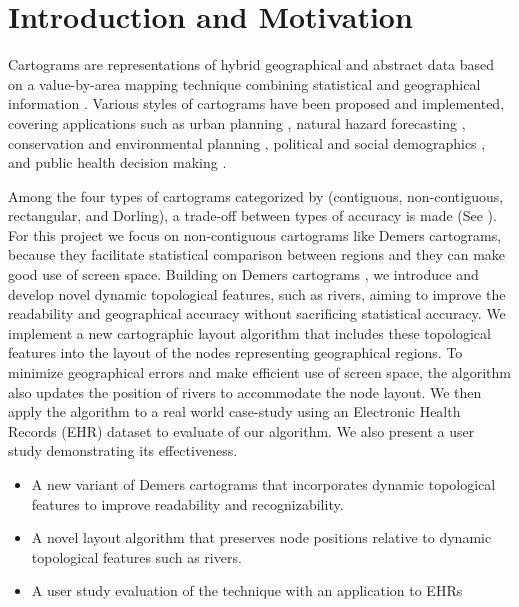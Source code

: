 \section{Introduction and Motivation}

Cartograms are representations of hybrid geographical and abstract data based on a value-by-area mapping technique combining statistical and geographical information \cite{dent2009Cartography}. Various styles of cartograms have been proposed and implemented, covering applications such as urban planning \cite{harris2018Mapping, arranz-lopez2021Enduser}, natural hazard forecasting \cite{pappenberger2019Cartograms, park2020Flood}, conservation and environmental planning \cite{galluzzi2018Mapping, rocchini2019Cartogramming}, political and social demographics \cite{breitzman2018Using, alieva2021How}, and public health decision making \cite{gao2020Visualising, sack2021Visualizing}.

Among the four types of cartograms categorized by  (contiguous, non-contiguous, rectangular, and Dorling), a trade-off between types of accuracy is made (See ). For this project we focus on non-contiguous cartograms like Demers cartograms, because they facilitate statistical comparison between regions and they can make good use of screen space. Building on Demers cartograms \cite{ian2002Cartogram}, we introduce and develop novel dynamic topological features, such as rivers, aiming to improve the readability and geographical accuracy without sacrificing statistical accuracy. We implement a new cartographic layout algorithm that includes these topological features into the layout of the nodes representing geographical regions. To minimize geographical errors and make efficient use of screen space, the algorithm also updates the position of rivers to accommodate the node layout. We then apply the algorithm to a real world case-study using an Electronic Health Records (EHR) dataset to evaluate of our algorithm. We also present a user study demonstrating its effectiveness.


\begin{itemize}
    \item A new variant of Demers cartograms that incorporates dynamic topological features to improve readability and recognizability.
    \item A novel layout algorithm that preserves node positions relative to dynamic topological features such as rivers.
    \item A user study evaluation of the technique with an application to EHRs
\end{itemize}

